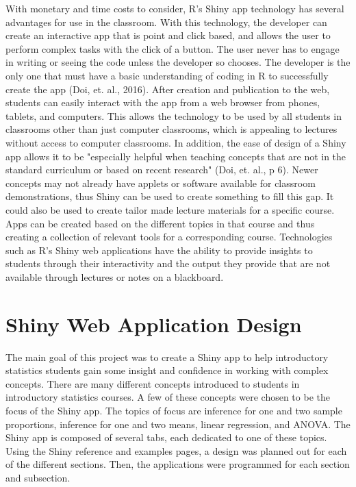 \documentclass[11pt]{book}
\begin{document}
With monetary and time costs to consider, R's Shiny app technology has several advantages for use in the classroom. With this technology, the developer can create an interactive app that is point and click based, and allows the user to perform complex tasks with the click of a button.  The user never has to engage in writing or seeing the code unless the developer so chooses.  The developer is the only one that must have a basic understanding of coding in R to successfully create the app (Doi, et. al., 2016). After creation and publication to the web, students can easily interact with the app from a web browser from phones, tablets, and computers. This allows the technology to be used by all students in classrooms other than just computer classrooms, which is appealing to lectures without access to computer classrooms. In addition, the ease of design of a Shiny app allows it to be "especially helpful when teaching concepts that are not in the standard curriculum or based on recent research" (Doi, et. al., p 6). Newer concepts may not already have applets or software available for classroom demonstrations, thus Shiny can be used to create something to fill this gap. It could also be used to create tailor made lecture materials for a specific course. Apps can be created based on the different topics in that course and thus creating a collection of relevant tools for a corresponding course. Technologies such as R's Shiny web applications have the ability to provide insights to students through their interactivity and the output they provide that are not available through lectures or notes on a blackboard.
 
 

\section{Shiny Web Application Design}
The main goal of this project was to create a Shiny app to help introductory statistics students gain some insight and confidence in working with complex concepts. There are many different concepts introduced to students in introductory statistics courses.  A few of these concepts were chosen to be the focus of the Shiny app.  The topics of focus are inference for one and two sample proportions, inference for one and two means, linear regression, and ANOVA.  The Shiny app is composed of several tabs, each dedicated to one of these topics. Using the Shiny reference and examples pages, a design was planned out for each of the different sections. Then, the applications were programmed for each section and subsection. 
\end{document}
